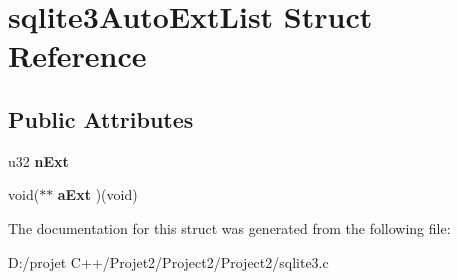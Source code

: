 \hypertarget{structsqlite3_auto_ext_list}{}\section{sqlite3\+Auto\+Ext\+List Struct Reference}
\label{structsqlite3_auto_ext_list}
\subsection*{Public Attributes}
\begin{DoxyCompactItemize}
\item 
\mbox{\label{structsqlite3_auto_ext_list_a8a9ca37538d5eb5649df5ffec973f8b6}} 
u32 {\bfseries n\+Ext}
\item 
\mbox{\label{structsqlite3_auto_ext_list_af71862afdba94794f12f1cbe20b7cb95}} 
void($\ast$$\ast$ {\bfseries a\+Ext} )(void)
\end{DoxyCompactItemize}


The documentation for this struct was generated from the following file\+:\begin{DoxyCompactItemize}
\item 
D\+:/projet C++/\+Projet2/\+Project2/\+Project2/sqlite3.\+c\end{DoxyCompactItemize}
